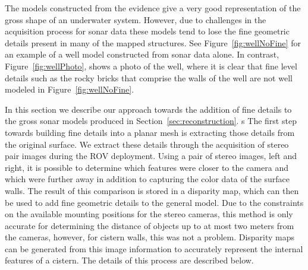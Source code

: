 \documentclass[a4paper,twoside]{article}
\begin{document}
\noindent The models constructed from the evidence give a very good representation of the gross shape of an underwater system.  However, due to challenges in the acquisition process for sonar data these models tend to lose the fine geometric details present in many of the mapped structures.  See Figure~\ref{fig:wellNoFine} for an example of a well model constructed from sonar data alone.  In contrast, Figure~\ref{fig:wellPhoto}, shows a photo of the well, where it is clear that fine level details such as the rocky bricks that comprise the walls of the well are not well modeled in Figure~\ref{fig:wellNoFine}.

In this section we describe our approach towards the addition of fine details to the gross sonar models produced in Section~\ref{sec:reconstruction}. 
s%
The first step towards building fine details into a planar mesh is extracting those details from the original surface. 
We extract these details through the acquisition of stereo pair images during the ROV deployment.
Using a pair of stereo images, left and right, it is possible to determine which features were closer to the camera and which were further away in addition to capturing the color data of the surface walls.  
The result of this comparison is stored in a disparity map, which can then be used to add fine geometric details to the general model.  
Due to the constraints on the available mounting positions for the stereo cameras, this method is only accurate for determining the distance of objects up to at most two meters from the cameras, however,  for cistern walls, this was not a problem.  
Disparity maps can be generated from this image information to accurately represent the internal features of a cistern. 
The details of this process are described below.
\end{document}
